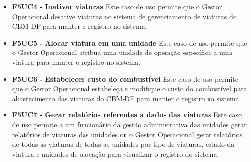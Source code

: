 \begin{itemize}
    \item \textbf{F5UC4 - Inativar viaturas}
      \subitem
      Este caso de uso permite que o Gestor Operacional desative viaturas no sistema de gerenciamento de viaturas do CBM-DF para 
      manter o registro no sistema.

    \item \textbf{F5UC5 - Alocar viatura em uma unidade}
      \subitem
      Este caso de uso permite que o Gestor Operacional atribua uma unidade de operação específica a uma viatura para manter o 
      registro no sistema.

    \item \textbf{F5UC6 - Estabelecer custo do combustível}
      \subitem
      Este caso de uso permite que o Gestor Operacional estabeleça e modifique o custo do combustível para abastecimento
      das viaturas do CBM-DF para manter o registro no sistema.

    \item \textbf{F5UC7 - Gerar relatórios referentes a dados das viaturas}
      \subitem
      Este caso de uso permite a um funcionário da gestão administrativa das unidades gerar relatórios de viaturas das
      unidades ou o Gestor Operacional gerar relatórios de todas as viaturas de todas as unidades por tipo de viaturas,
      estado da viatura e unidades de alocação para visualizar o registro do sistema.

\end{itemize}